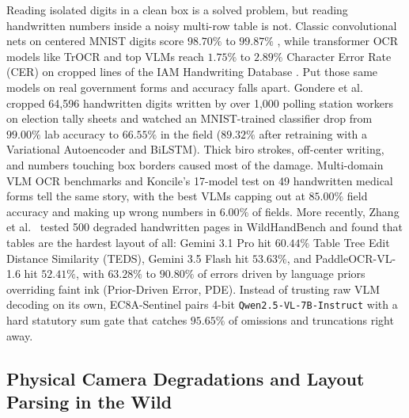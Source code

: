 \documentclass{article}
\begin{document}
Reading isolated digits in a clean box is a solved problem, but reading handwritten numbers inside a noisy multi-row table is not. Classic convolutional nets on centered MNIST digits score $98.70\%$ to $99.87\%$ \cite{lecun1998gradient}, while transformer OCR models like TrOCR \cite{li2023trocr} and top VLMs reach $1.75\%$ to $2.89\%$ Character Error Rate (CER) on cropped lines of the IAM Handwriting Database \cite{koncile2025ocr}. Put those same models on real government forms and accuracy falls apart. Gondere et al.\ \cite{gondere2016election} cropped 64,596 handwritten digits written by over 1,000 polling station workers on election tally sheets and watched an MNIST-trained classifier drop from $99.00\%$ lab accuracy to $66.55\%$ in the field ($89.32\%$ after retraining with a Variational Autoencoder and BiLSTM). Thick biro strokes, off-center writing, and numbers touching box borders caused most of the damage. Multi-domain VLM OCR benchmarks \cite{alkhaled2025benchmarking,fu2025ocrbenchv2,poznanski2025olmocr} and Koncile's 17-model test on 49 handwritten medical forms \cite{koncile2025ocr} tell the same story, with the best VLMs capping out at $85.00\%$ field accuracy and making up wrong numbers in $6.00\%$ of fields. More recently, Zhang et al.\ \cite{zhang2026wildhandbench} tested 500 degraded handwritten pages in WildHandBench and found that tables are the hardest layout of all: Gemini 3.1 Pro hit $60.44\%$ Table Tree Edit Distance Similarity (TEDS), Gemini 3.5 Flash hit $53.63\%$, and PaddleOCR-VL-1.6 hit $52.41\%$, with $63.28\%$ to $90.80\%$ of errors driven by language priors overriding faint ink (Prior-Driven Error, PDE). Instead of trusting raw VLM decoding on its own, EC8A-Sentinel pairs 4-bit \texttt{Qwen2.5-VL-7B-Instruct} \cite{bai2025qwen25vl,dettmers2023qlora,dehghani2023navit} with a hard statutory sum gate that catches $95.65\%$ of omissions and truncations right away.

\subsection{Physical Camera Degradations and Layout Parsing in the Wild}
\end{document}
